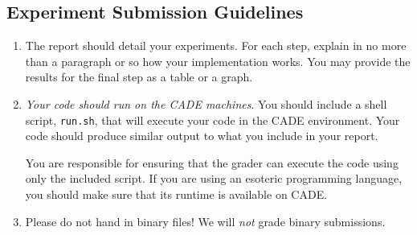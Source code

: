 
\subsection*{Experiment Submission Guidelines}
\begin{enumerate}
\item The report should detail your experiments. For each step,
  explain in no more than a paragraph or so how your implementation
  works. You may provide the results for the final step as a table or
  a graph. 

\item {\em Your code should run on the CADE machines}. You should
  include a shell script, {\tt run.sh}, that will execute your code
  in the CADE environment. Your code should produce similar output
  to what you include in your report.
  
  You are responsible for ensuring that the grader can execute the
  code using only the included script. If you are using an
  esoteric programming language, you should make sure that its
  runtime is available on CADE.

\item Please do not hand in binary files! We will {\em not} grade
  binary submissions.

\end{enumerate}


